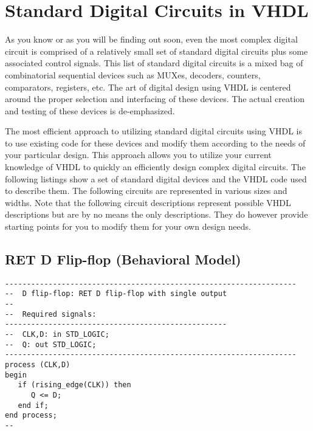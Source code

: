 %
%
%
\chapter{Standard Digital Circuits in VHDL}
As you know or as you will be finding out soon, even the most complex digital circuit is comprised of a relatively small set of standard digital circuits plus some associated control signals. This list of standard digital circuits is a mixed bag of combinatorial sequential devices such as MUXes, decoders, counters, comparators, registers, etc. The art of digital design using VHDL is centered around the proper selection and interfacing of these devices. The actual creation and testing of these devices is de-emphasized. 

The most efficient approach to utilizing standard digital circuits using VHDL is to use existing code for these devices and modify them according to the needs of your particular design. This approach allows you to utilize your current knowledge of VHDL to quickly an efficiently design complex digital circuits. The following listings show a set of standard digital devices and the VHDL code used to describe them. The following circuits are represented in various sizes and widths. Note that the following circuit descriptions represent possible VHDL descriptions but are by no means the only descriptions. They do however provide starting points for you to modify them for your own design needs. 

\section{RET D Flip-flop (Behavioral Model)}
\noindent
\begin{minipage}{1\linewidth}
\begin{lstlisting}
-------------------------------------------------------------------
--  D flip-flop: RET D flip-flop with single output
--
--  Required signals: 
---------------------------------------------------
--  CLK,D: in STD_LOGIC;
--  Q: out STD_LOGIC;
-------------------------------------------------------------------
process (CLK,D) 
begin
   if (rising_edge(CLK)) then  
      Q <= D;
   end if;
end process;
--
\end{lstlisting}
\end{minipage}


